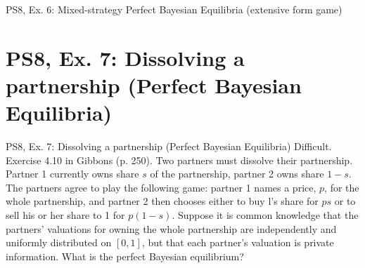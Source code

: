 \begin{frame}{PS8, Ex. 6: Mixed-strategy Perfect Bayesian Equilibria (extensive form game)}
    \begin{multicols}{2}
      \vfill\null\columnbreak
      \vfill\null
    \end{multicols}
\end{frame}




\section{PS8, Ex. 7: Dissolving a partnership (Perfect Bayesian Equilibria)}

\begin{frame}{PS8, Ex. 7: Dissolving a partnership (Perfect Bayesian Equilibria)}
    Difficult. Exercise 4.10 in Gibbons (p. 250). Two partners must dissolve their partnership. Partner 1 currently owns share $s$ of the partnership, partner 2 owns share $1-s$. The partners agree to play the following game: partner 1 names a price, $p$, for the whole partnership, and partner 2 then chooses either to buy l's share for $ps$ or to sell his or her share to 1 for $p(1-s)$. Suppose it is common knowledge that the partners' valuations for owning the whole partnership are independently and uniformly distributed on $[0,1]$, but that each partner's valuation is private information. What is the perfect Bayesian equilibrium?
    \begin{multicols}{2}
      \vfill\null\columnbreak
      \vfill\null
    \end{multicols}
\end{frame}
